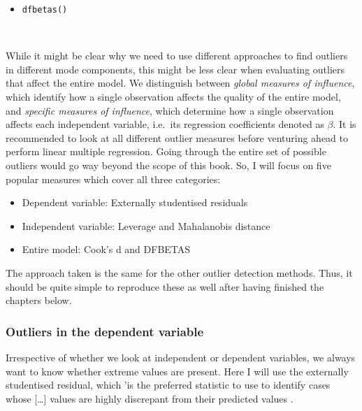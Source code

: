 \documentclass[
]{book}
\providecommand{\tightlist}{%
  \setlength{\itemsep}{0pt}\setlength{\parskip}{0pt}}
\begin{document}
\begin{longtable}[]
\begin{minipage}[t]{\linewidth}
\begin{itemize}
\tightlist
\item
  \texttt{dfbetas()}
\end{itemize}
\end{minipage} \\
\bottomrule
\end{longtable}

While it might be clear why we need to use different approaches to find outliers in different mode components, this might be less clear when evaluating outliers that affect the entire model. We distinguish between \emph{global measures of influence}, which identify how a single observation affects the quality of the entire model, and \emph{specific measures of influence}, which determine how a single observation affects each independent variable, i.e.~its regression coefficients denoted as \(\beta\). It is recommended to look at all different outlier measures before venturing ahead to perform linear multiple regression. Going through the entire set of possible outliers would go way beyond the scope of this book. So, I will focus on five popular measures which cover all three categories:

\begin{itemize}
\item
  Dependent variable: Externally studentised residuals
\item
  Independent variable: Leverage and Mahalanobis distance
\item
  Entire model: Cook's d and DFBETAS
\end{itemize}

The approach taken is the same for the other outlier detection methods. Thus, it should be quite simple to reproduce these as well after having finished the chapters below.

\hypertarget{outliers-in-the-dependent-variable}{%
\subsubsection{Outliers in the dependent variable}\label{outliers-in-the-dependent-variable}}

Irrespective of whether we look at independent or dependent variables, we always want to know whether extreme values are present. Here I will use the externally studentised residual, which 'is the preferred statistic to use to identify cases whose {[}\ldots{]} values are highly discrepant from their predicted values \citep[p.401]{cohen2014applied}.
\end{document}
